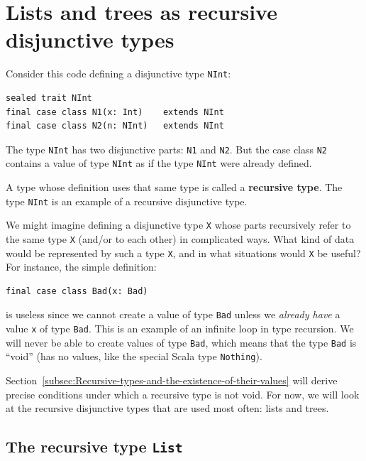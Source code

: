 \section{Lists and trees as recursive disjunctive types\label{sec:Lists-and-trees:recursive-disjunctive-types}}

Consider this code defining a disjunctive type \lstinline!NInt!:
\begin{lstlisting}
sealed trait NInt
final case class N1(x: Int)    extends NInt
final case class N2(n: NInt)   extends NInt
\end{lstlisting}
The type \lstinline!NInt! has two disjunctive parts: \lstinline!N1!
and \lstinline!N2!. But the case class \lstinline!N2! contains a
value of type \lstinline!NInt! as if the type \lstinline!NInt! were
already defined. 

A type whose definition uses that same type is called a \textbf{recursive
type}. The type \lstinline!NInt! is an example of a recursive disjunctive
type.

We might imagine defining a disjunctive type \lstinline!X! whose
parts recursively refer to the same type \lstinline!X! (and/or to
each other) in complicated ways. What kind of data would be represented
by such a type \lstinline!X!, and in what situations would \lstinline!X!
be useful? For instance, the simple definition:
\begin{lstlisting}
final case class Bad(x: Bad)
\end{lstlisting}
is useless since we cannot create a value of type \lstinline!Bad!
unless we \emph{already have} a value \lstinline!x! of type \lstinline!Bad!.
This is an example of an infinite loop in type recursion.
We will never be able to create values of type \lstinline!Bad!, which
means that the type \lstinline!Bad! is \textsf{``}void\textsf{''}
(has no values, like the special Scala type \lstinline!Nothing!). 

Section~\ref{subsec:Recursive-types-and-the-existence-of-their-values}
will derive precise conditions under which a recursive type is not
void. For now, we will look at the recursive disjunctive types that
are used most often: lists and trees.

\subsection{\label{subsec:The-recursive-type-List}The recursive type \texttt{List}}

